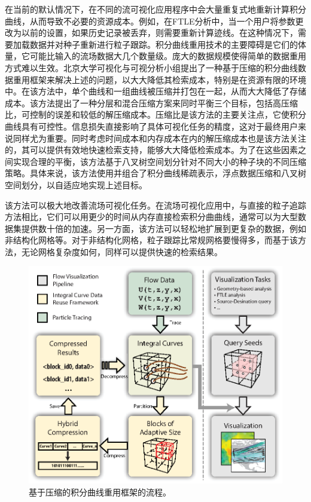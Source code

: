 在当前的默认情况下，在不同的流可视化应用程序中会大量重复式地重新计算积分曲线，从而导致不必要的资源成本。例如，在FTLE分析中，当一个用户将参数更改为以前的设置，如果历史记录被丢弃，则需要重新计算迹线。在这种情况下，需要加载数据并对种子重新进行粒子跟踪。积分曲线重用技术的主要障碍是它们的体量，它可能比输入的流场数据大几个数量级。庞大的数据规模使得简单的数据重用方式难以生效。北京大学可视化与可视分析小组提出了一种基于压缩的积分曲线数据重用框架\parencite{hong2017compression}来解决上述的问题，以大大降低其检索成本，特别是在资源有限的环境中。在该方法中，单个曲线和一组曲线被压缩并打包在一起，从而大大降低了存储成本。该方法提出了一种分层和混合压缩方案来同时平衡三个目标，包括高压缩比，可控制的误差和较低的解压缩成本。压缩比是该方法的主要关注点，它使积分曲线具有可控性。信息损失直接影响了具体可视化任务的精度，这对于最终用户来说同样尤为重要。同时考虑时间成本和内存成本在内的解压缩成本也是该方法关注的，其可以提供有效地快速检索支持，能够大大降低检索成本。为了在这些因素之间实现合理的平衡，该方法基于八叉树空间划分针对不同大小的种子块的不同压缩策略。具体来说，该方法使用并组合了积分曲线稀疏表示，浮点数据压缩和八叉树空间划分，以自适应地实现上述目标。

该方法可以极大地改善流场可视化任务。在流场可视化应用中，与直接的粒子追踪方法相比，它们可以用更少的时间从内存直接检索积分曲曲线，通常可以为大型数据集提供数十倍的加速。另一方面，该方法可以轻松地扩展到更复杂的数据，例如非结构化网格等。对于非结构化网格，粒子跟踪比常规网格要慢得多，而基于该方法，无论网格复杂度如何，同样可以提供快速的检索结果。

\begin{figure}[htbp]
	\centering
	\includegraphics[width=.7\columnwidth]{image/linecompress/workflow.eps}
	\caption{
	基于压缩的积分曲线重用框架的流程\parencite{hong2017compression}。
	}
	\label{fig:workflow}
\end{figure}

